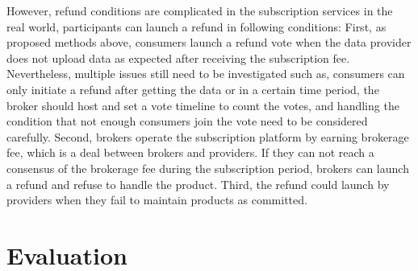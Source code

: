 \begin{spacing}{2.0}
However, refund conditions are complicated in the subscription services in the real world, participants can launch a refund in following conditions: First, as proposed methods above, consumers launch a refund vote when the data provider does not upload data as expected after receiving the subscription fee. Nevertheless, multiple issues still need to be investigated such as, consumers can only initiate a refund after getting the data or in a certain time period, the broker should host and set a vote timeline to count the votes, and handling the condition that not enough consumers join the vote need to be considered carefully. Second, brokers operate the subscription platform by earning brokerage fee, which is a deal between brokers and providers. If they can not reach a consensus of the brokerage fee during the subscription period, brokers can launch a refund and refuse to handle the product. Third, the refund could launch by providers when they fail to maintain products as committed.

\end{spacing}

\clearpage
{}

\newpage
{}
\chapter{Evaluation}
\pagestyle{plain}

